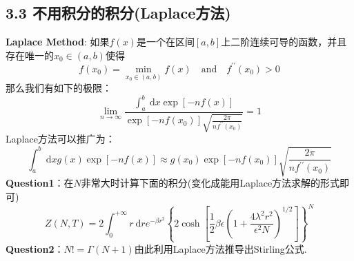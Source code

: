 \documentclass[UTF8,fontset=windows,oneside]{ctexbook}
\begin{document}
\subsection*{3.3 不用积分的积分(Laplace方法)}
\textbf{Laplace Method}: 如果$f(x)$是一个在区间$[a,b]$上二阶连续可导的函数，并且存在唯一的$x_0\in(a,b)$使得
\[f(x_0)=\min\limits_{x_0\in(a,b)}f(x)\quad \text{and}\quad f^{\prime\prime}(x_0)>0\]
那么我们有如下的极限：
\begin{equation}
	\lim_{n\to\infty}\frac{\int_{a}^{b}\mathrm{~d}x\exp[-nf(x)]}{\exp[-nf(x_0)]\sqrt{\frac{2\pi}{nf^{\prime\prime}(x_0)}}}=1
\end{equation}
Laplace方法可以推广为：
\begin{equation}
	\int_{a}^{b}\mathrm{~d}xg(x)\exp[-nf(x)]\approx g(x_0)\exp[-nf(x_0)]\sqrt{\frac{2\pi}{nf^{\prime\prime}(x_0)}}
\end{equation}
\textbf{Question1}：在$N$非常大时计算下面的积分(变化成能用Laplace方法求解的形式即可)
\begin{equation}
	Z(N,T)=2\int_{0}^{+\infty}r\mathrm{~d}re^{-\beta r^2}\left\{2\cosh\left[\frac{1}{2}\beta\epsilon\left(1+\frac{4\lambda^2r^2}{\epsilon^2N}\right)^{1/2}\right]\right\}^N
\end{equation}
\textbf{Question2}：$N!=\Gamma(N+1)$由此利用Laplace方法推导出Stirling公式.
\end{document}

